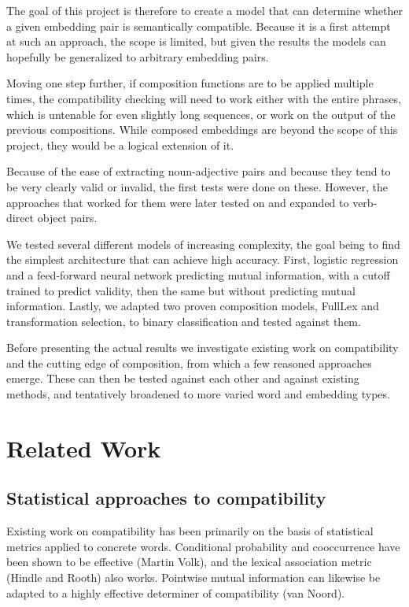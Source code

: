 \documentclass[a4paper, 11pt]{scrartcl}
\begin{document}
The goal of this project is therefore to create a model that can determine whether a given embedding pair is semantically compatible. Because it is a first attempt at such an approach, the scope is limited, but given the results the models can hopefully be generalized to arbitrary embedding pairs.

Moving one step further, if composition functions are to be applied multiple times, the compatibility checking will need to work either with the entire phrases, which is untenable for even slightly long sequences, or work on the output of the previous compositions. While composed embeddings are beyond the scope of this project, they would be a logical extension of it.

Because of the ease of extracting noun-adjective pairs and because they tend to be very clearly valid or invalid, the first tests were done on these. However, the approaches that worked for them were later tested on and expanded to verb-direct object pairs.

We tested several different models of increasing complexity, the goal being to find the simplest architecture that can achieve high accuracy. First, logistic regression and a feed-forward neural network predicting mutual information, with a cutoff trained to predict validity, then the same but without predicting mutual information. Lastly, we adapted two proven composition models, FullLex and transformation selection, to binary classification and tested against them.

Before presenting the actual results we investigate existing work on compatibility and the cutting edge of composition, from which a few reasoned approaches emerge. These can then be tested against each other and against existing methods, and tentatively broadened to more varied word and embedding types.


\section{Related Work}

\subsection{Statistical approaches to compatibility}

Existing work on compatibility has been primarily on the basis of statistical metrics applied to concrete words. Conditional probability and cooccurrence have been shown to be effective (Martin Volk), and the lexical association metric (Hindle and Rooth) also works. Pointwise mutual information can likewise be adapted to a highly effective determiner of compatibility (van Noord).
\end{document}
